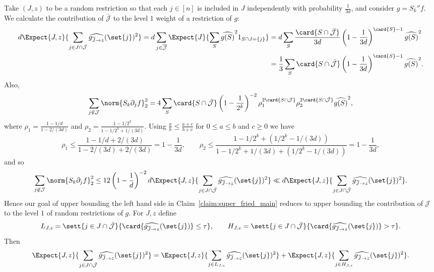   Take $(J,z)$ to be a random restriction so that each $j\in [n]$ is included in $J$ independently with probability $\frac{1}{3d}$,
  and consider $g = S_k'' f$.
  We calculate
  the contribution of $\bar{\mathcal{J}}$ to the level $1$ weight of a restriction of $g$:
  \begin{align*}
  d\Expect{J, z}{\sum\limits_{j\in J\cap \bar{\mathcal{J}}}\widehat{g_{\overline{J}\rightarrow z}}(\set{j})^2}
  =d\sum\limits_{j\in \overline{\mathcal{J}}}\Expect{J}{\sum\limits_{S}\widehat{g(S)}^2 1_{S\cap J = \{j\}}}
  &=d\sum\limits_{S}\frac{\card{S\cap \bar{\mathcal{J}}}}{3d}\left(1-\frac{1}{3d}\right)^{\card{S}-1}\widehat{g(S)}^2\\
  &=\frac{1}{3}\sum\limits_{S}\card{S\cap \bar{\mathcal{J}}}\left(1-\frac{1}{3d}\right)^{\card{S}-1}\widehat{g(S)}^2.
  \end{align*}
  Also,
  \begin{align*}
    \sum\limits_{j\not\in \mathcal{J}} \norm{S_k \partial_j f}_2^2
    =
    4\sum\limits_{S}
    \card{S\cap \bar{\mathcal{J}}}
    \left(1-\frac{1}{2^k}\right)^{-2}\rho_1^{2\card{S\cap \mathcal{J}}}
    \rho_2^{2\card{S\cap \bar{\mathcal{J}}}}\widehat{g(S)}^2,
  \end{align*}
  where $\rho_1 = \frac{1-1/d}{1-2/(3d)}$ and $\rho_2 = \frac{1-1/2^k}{1-1/2^k+1/(3d)}$. Using $\frac{a}{b}\leq \frac{a+c}{b+c}$ for $0\leq a\leq b$ and $c\geq 0$ we have
  \[
  \rho_1 \leq \frac{1-1/d+2/(3d)}{1-2/(3d)+2/(3d)} = 1-\frac{1}{3d},
  \qquad
  \rho_2 \leq \frac{1-1/2^k+(1/2^k-1/(3d))}{1-1/2^k+1/(3d)+(1/2^k-1/(3d))} = 1-\frac{1}{3d},
  \]
  and so
  \[
  \sum\limits_{j\not\in \mathcal{J}} \norm{S_k \partial_j f}_2^2\leq
  12\left(1-\frac{1}{d}\right)^{-2} d\Expect{J, z}{\sum\limits_{j\in J\cap \bar{\mathcal{J}}}\widehat{g_{\overline{J}\rightarrow z}}(\set{j})^2}
  \ll d\Expect{J, z}{\sum\limits_{j\in J\cap \bar{\mathcal{J}}}\widehat{g_{\overline{J}\rightarrow z}}(\set{j})^2}.
  \]
  Hence our
  goal of upper bounding the left hand side in Claim~\ref{claim:super_fried_main} reduces to
  upper bounding the contribution of $\mathcal{J}$ to the level $1$ of random restrictions of $g$. For $J, z$ define
 \[
  L_{J,z} = \sett{j\in J\cap \bar{\mathcal{J}}}{\card{\widehat{g_{\overline{J}\rightarrow z}}(\set{j})} \leq \tau},
  \qquad
  H_{J,z} = \sett{j\in J\cap \bar{\mathcal{J}}}{\card{\widehat{g_{\overline{J}\rightarrow z}}(\set{j})} > \tau}.
  \]
  Then
  \[
  \Expect{J, z}{\sum\limits_{j\in J\cap \bar{\mathcal{J}}}\widehat{g_{\overline{J}\rightarrow z}}(\set{j})^2}
  =\Expect{J, z}{\sum\limits_{j\in L_{J,z}}\widehat{g_{\overline{J}\rightarrow z}}(\set{j})^2}
  +\Expect{J, z}{\sum\limits_{j\in H_{J,z}}\widehat{g_{\overline{J}\rightarrow z}}(\set{j})^2}.
  \]

